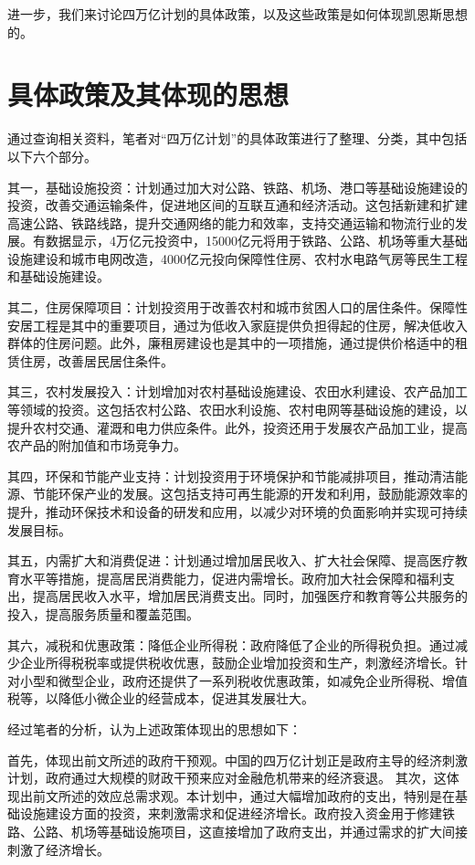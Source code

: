\documentclass[UTF8,openany]{ctexbook}
\begin{document}
进一步，我们来讨论四万亿计划的具体政策，以及这些政策是如何体现凯恩斯思想的。
\newpage
\section{具体政策及其体现的思想}
通过查询相关资料，笔者对“四万亿计划”的具体政策进行了整理、分类，其中包括以下六个部分。

其一，基础设施投资：计划通过加大对公路、铁路、机场、港口等基础设施建设的投资，改善交通运输条件，促进地区间的互联互通和经济活动。这包括新建和扩建高速公路、铁路线路，提升交通网络的能力和效率，支持交通运输和物流行业的发展。有数据显示，4万亿元投资中，15000亿元将用于铁路、公路、机场等重大基础设施建设和城市电网改造，4000亿元投向保障性住房、农村水电路气房等民生工程和基础设施建设。\cite{bi:3}

其二，住房保障项目：计划投资用于改善农村和城市贫困人口的居住条件。保障性安居工程是其中的重要项目，通过为低收入家庭提供负担得起的住房，解决低收入群体的住房问题。此外，廉租房建设也是其中的一项措施，通过提供价格适中的租赁住房，改善居民居住条件。

其三，农村发展投入：计划增加对农村基础设施建设、农田水利建设、农产品加工等领域的投资。这包括农村公路、农田水利设施、农村电网等基础设施的建设，以提升农村交通、灌溉和电力供应条件。此外，投资还用于发展农产品加工业，提高农产品的附加值和市场竞争力。

其四，环保和节能产业支持：计划投资用于环境保护和节能减排项目，推动清洁能源、节能环保产业的发展。这包括支持可再生能源的开发和利用，鼓励能源效率的提升，推动环保技术和设备的研发和应用，以减少对环境的负面影响并实现可持续发展目标。

其五，内需扩大和消费促进：计划通过增加居民收入、扩大社会保障、提高医疗教育水平等措施，提高居民消费能力，促进内需增长。政府加大社会保障和福利支出，提高居民收入水平，增加居民消费支出。同时，加强医疗和教育等公共服务的投入，提高服务质量和覆盖范围。

其六，减税和优惠政策：降低企业所得税：政府降低了企业的所得税负担。通过减少企业所得税税率或提供税收优惠，鼓励企业增加投资和生产，刺激经济增长。针对小型和微型企业，政府还提供了一系列税收优惠政策，如减免企业所得税、增值税等，以降低小微企业的经营成本，促进其发展壮大。

经过笔者的分析，认为上述政策体现出的思想如下：

首先，体现出前文所述的政府干预观。中国的四万亿计划正是政府主导的经济刺激计划，政府通过大规模的财政干预来应对金融危机带来的经济衰退。
其次，这体现出前文所述的效应总需求观。本计划中，通过大幅增加政府的支出，特别是在基础设施建设方面的投资，来刺激需求和促进经济增长。政府投入资金用于修建铁路、公路、机场等基础设施项目，这直接增加了政府支出，并通过需求的扩大间接刺激了经济增长。
\end{document}
